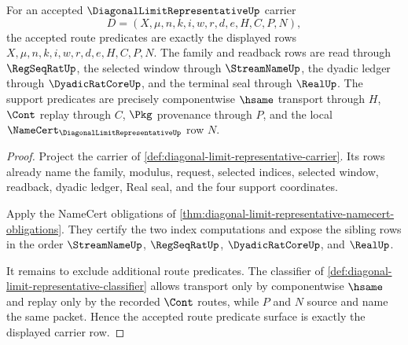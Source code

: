 \begin{theorem}
\label{thm:diagonal-limit-representative-route-predicate-obligation}
For an accepted $\DiagonalLimitRepresentativeUp$ carrier
$$
D=(X,\mu,n,k,i,w,r,d,e,H,C,P,N),
$$
the accepted route predicates are exactly the displayed rows $X,\mu,n,k,i,w,r,d,e,H,C,P,N$. The family and readback rows are read through $\RegSeqRatUp$, the selected window through $\StreamNameUp$, the dyadic ledger through $\DyadicRatCoreUp$, and the terminal seal through $\RealUp$. The support predicates are precisely componentwise $\hsame$ transport through $H$, $\Cont$ replay through $C$, $\Pkg$ provenance through $P$, and the local $\NameCert_{\DiagonalLimitRepresentativeUp}$ row $N$.
\end{theorem}
\begin{proof}
Project the carrier of \autoref{def:diagonal-limit-representative-carrier}. Its rows already name the family, modulus, request, selected indices, selected window, readback, dyadic ledger, Real seal, and the four support coordinates.

Apply the NameCert obligations of \autoref{thm:diagonal-limit-representative-namecert-obligations}. They certify the two index computations and expose the sibling rows in the order $\StreamNameUp$, $\RegSeqRatUp$, $\DyadicRatCoreUp$, and $\RealUp$.

It remains to exclude additional route predicates. The classifier of \autoref{def:diagonal-limit-representative-classifier} allows transport only by componentwise $\hsame$ and replay only by the recorded $\Cont$ routes, while $P$ and $N$ source and name the same packet. Hence the accepted route predicate surface is exactly the displayed carrier row.
\end{proof}

